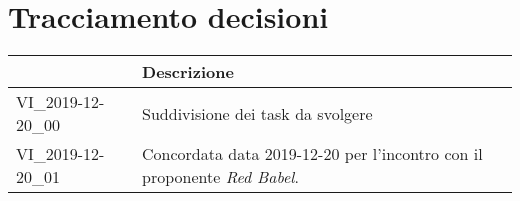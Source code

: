 \section{Tracciamento decisioni}
\renewcommand{\arraystretch}{1.8}

  \begin{longtable}{|p{5cm}|p{9cm}|}
    \hline

    \rowcolor{header}
    \centering{\textbf{Codice}} &  \textbf{Descrizione}\\

    \hline

    VI\_2019-12-20\_00 & Suddivisione dei task da svolgere  \\
    VI\_2019-12-20\_01 & Concordata data 2019-12-20 per l'incontro con il proponente \textit{Red Babel}.  \\

    \hline
  \end{longtable}
